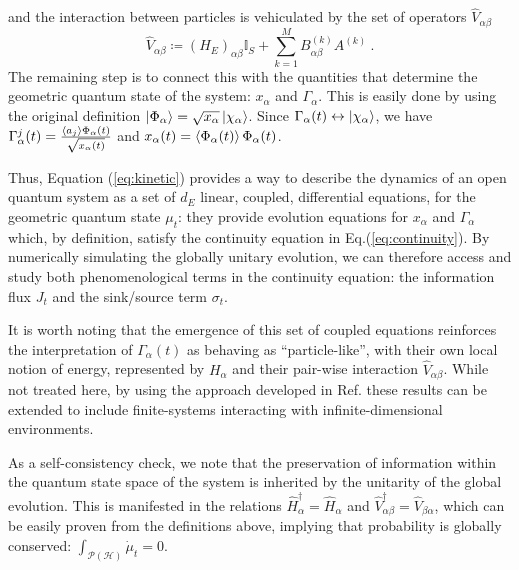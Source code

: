 \documentclass[draft,nofootinbib,pre,twocolumn,showpacs,showkeys,preprintnumbers,floatfix]{revtex4-1}
\newcommand{\1}{\mathbbm{1}}
\newcommand{\PH}{\mathcal{P}(\mathcal{H})}
\begin{document}
and the interaction between particles is vehiculated by the set of operators $\hat{V}_{\alpha \beta}$
\begin{equation}
\hat{V}_{\alpha \beta} \coloneqq \left( H_E\right)_{\alpha \beta} \mathbb{I}_S + \sum_{k=1}^M B^{(k)}_{\alpha \beta} A^{(k)}~.\label{ed:def_V}
\end{equation}
The remaining step is to connect this with the quantities that determine the geometric quantum state of the system: $x_\alpha$ and $\Gamma_\alpha$.
This is easily done by using the original definition $\ket{\Phi_\alpha} = \sqrt{x_\alpha} \ket{\chi_\alpha}$. Since $\Gamma_\alpha(t) \leftrightarrow \ket{\chi_\alpha}$,
we have $\Gamma^j_\alpha(t) = \frac{\braket{a_j}{\Phi_\alpha(t)}}{\sqrt{x_\alpha(t)}}$ and $x_\alpha(t) = \braket{\Phi_\alpha(t)}{\Phi_\alpha(t)}$. 



Thus, Equation (\ref{eq:kinetic}) provides a way to describe the dynamics of an open 
quantum system as a set of $d_E$ linear, coupled, differential equations, for the 
geometric quantum state $\mu_t$: they provide evolution equations for $x_\alpha$ and $\Gamma_\alpha$
which, by definition, satisfy the continuity equation in Eq.(\ref{eq:continuity}). By numerically
simulating the globally unitary evolution, we can therefore access and study both
phenomenological terms in the continuity equation: the information flux $J_t$ and
the sink/source term $\sigma_t$.


It is worth noting that the emergence of this set of coupled equations reinforces the 
interpretation of $\Gamma_\alpha(t)$ as behaving as ``particle-like'', with their own local 
notion of energy, represented by $H_\alpha$ and their pair-wise interaction $\hat{V}_{\alpha \beta}$. 
While not treated here, by using the approach developed in Ref.\cite{Anza20a} these 
results can be extended to include finite-systems interacting with infinite-dimensional environments.

As a self-consistency check, we note that the preservation of information within the 
quantum state space of the system is inherited by the unitarity of the global evolution. 
This is manifested in the relations $\hat{H}_\alpha^\dagger = \hat{H}_\alpha$ and 
$\hat{V}_{\alpha \beta}^{\dagger} = \hat{V}_{\beta \alpha}$, which can be 
easily proven from the definitions above, implying that 
probability is globally conserved: $\int_{\PH} \dot{\mu}_t = 0$.
\end{document}
